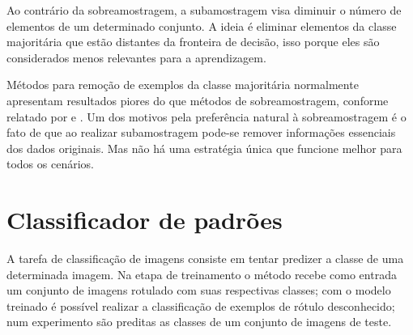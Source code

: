 Ao contrário da sobreamostragem, a subamostragem visa diminuir o número de elementos de um determinado conjunto. A ideia é eliminar elementos da classe majoritária que estão distantes da fronteira de decisão, isso porque eles são considerados menos relevantes para a aprendizagem.

Métodos para remoção de exemplos da classe majoritária normalmente apresentam resultados piores do que métodos de sobreamostragem, conforme relatado por  e . Um dos motivos pela preferência natural à sobreamostragem é o fato de que ao realizar subamostragem pode-se remover informações essenciais dos dados originais. Mas não há uma estratégia única que funcione melhor para todos os cenários.

\section{Classificador de padrões}
\label{sec:classificacao}

A tarefa de classificação de imagens consiste em tentar predizer a classe de uma determinada imagem. Na etapa de treinamento o método recebe como entrada um conjunto de imagens rotulado com suas respectivas classes; com o modelo treinado é possível realizar a classificação de exemplos de rótulo desconhecido; num experimento são preditas as classes de um conjunto de imagens de teste.





